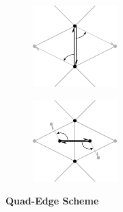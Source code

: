 \documentclass{stdlocal}
\begin{document}
  \begin{figure}[h]
    \centering
    \begin{subfigure}[b]{0.4\linewidth}
      \centering
      \includegraphics[width=\linewidth]{figures/quad-edge-edge.pdf}
    \end{subfigure}
    \hfill
    \begin{subfigure}[b]{0.4\linewidth}
      \centering
      \includegraphics[width=\linewidth]{figures/quad-edge-dual.pdf}
    \end{subfigure}
    \caption[Quad-Edge Scheme]{
      \textbf{Quad-Edge Scheme}\\
    }
  \end{figure}
\end{document}
